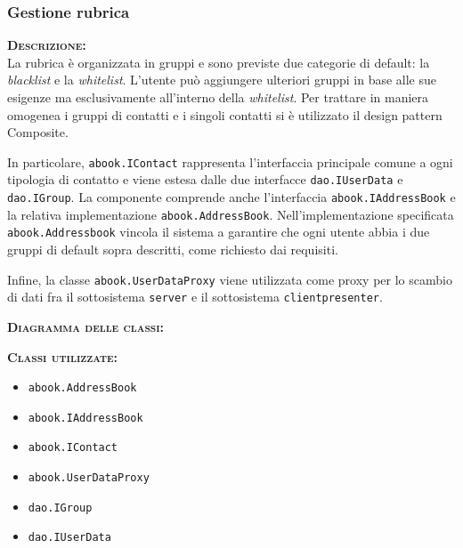 \subsubsection{Gestione rubrica}
\begin{description}
	\item{\scshape\bfseries Descrizione:}\\
La rubrica è organizzata in gruppi e sono previste due categorie di default: la \textit{blacklist} e la \textit{whitelist}. L'utente può aggiungere ulteriori gruppi in base alle sue esigenze ma esclusivamente all'interno della \textit{whitelist}. Per trattare in maniera omogenea i gruppi di contatti e i singoli contatti si è utilizzato il design pattern Composite.

In particolare, \texttt{abook.IContact} rappresenta l'interfaccia principale comune a ogni tipologia di contatto e viene estesa dalle due interfacce \texttt{dao.IUserData} e \texttt{dao.IGroup}. La componente comprende anche l'interfaccia \texttt{abook.IAddressBook} e la relativa implementazione \texttt{abook.AddressBook}. Nell'implementazione specificata \texttt{abook.Addressbook} vincola il sistema a garantire che ogni utente abbia i due gruppi di default sopra descritti, come richiesto dai requisiti.

Infine, la classe \texttt{abook.UserDataProxy} viene utilizzata come proxy per lo scambio di dati fra il sottosistema \texttt{server} e il sottosistema \texttt{clientpresenter}.
	\item{\scshape\bfseries Diagramma delle classi:}
	\item{\scshape\bfseries Classi utilizzate:}\\
\begin{itemize}
  \item \texttt{abook.AddressBook}
  \item \texttt{abook.IAddressBook}
  \item \texttt{abook.IContact}
  \item \texttt{abook.UserDataProxy}
  \item \texttt{dao.IGroup}
  \item \texttt{dao.IUserData}
\end{itemize}
\end{description}

